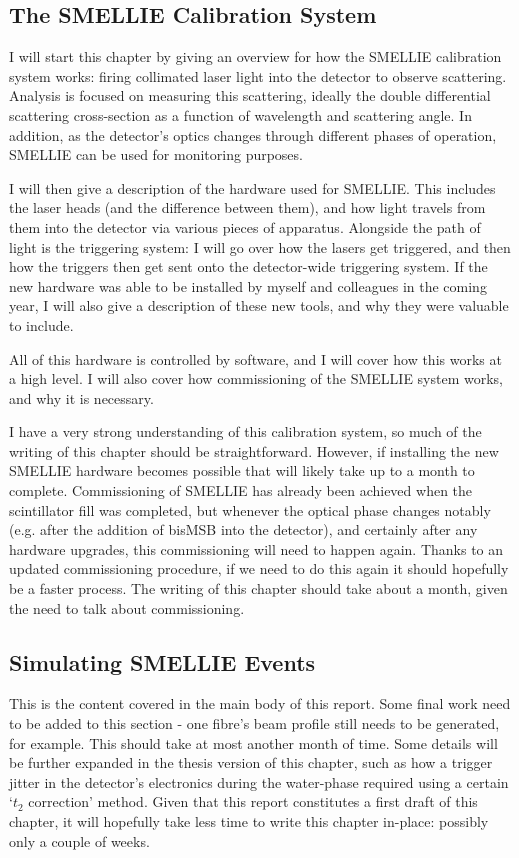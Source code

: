 \subsection{The SMELLIE Calibration System}
I will start this chapter by giving an overview for how the SMELLIE calibration system works: firing collimated laser light into the detector to observe scattering. Analysis is focused on measuring this scattering, ideally the double differential scattering cross-section as a function of wavelength and scattering angle. In addition, as the detector's optics changes through different phases of operation, SMELLIE can be used for monitoring purposes.

I will then give a description of the hardware used for SMELLIE. This includes the laser heads (and the difference between them), and how light travels from them into the detector via various pieces of apparatus. Alongside the path of light is the triggering system: I will go over how the lasers get triggered, and then how the triggers then get sent onto the detector-wide triggering system. If the new hardware was able to be installed by myself and colleagues in the coming year, I will also give a description of these new tools, and why they were valuable to include.

All of this hardware is controlled by software, and I will cover how this works at a high level. I will also cover how commissioning of the SMELLIE system works, and why it is necessary.

I have a very strong understanding of this calibration system, so much of the writing of this chapter should be straightforward. However, if installing the new SMELLIE hardware becomes possible that will likely take up to a month to complete. Commissioning of SMELLIE has already been achieved when the scintillator fill was completed, but whenever the optical phase changes notably (e.g. after the addition of bisMSB into the detector), and certainly after any hardware upgrades, this commissioning will need to happen again. Thanks to an updated commissioning procedure, if we need to do this again it should hopefully be a faster process. The writing of this chapter should take about a month, given the need to talk about commissioning.

\subsection{Simulating SMELLIE Events}
This is the content covered in the main body of this report. Some final work need to be added to this section - one fibre's beam profile still needs to be generated, for example. This should take at most another month of time. Some details will be further expanded in the thesis version of this chapter, such as how a trigger jitter in the detector's electronics during the water-phase required using a certain `$t_2$ correction' method. Given that this report constitutes a first draft of this chapter, it will hopefully take less time to write this chapter in-place: possibly only a couple of weeks.

